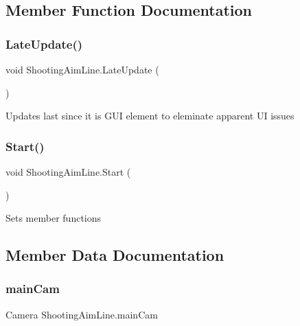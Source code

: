\subsection{Member Function Documentation}
\mbox{\label{class_shooting_aim_line_abe1fb3aafc6c03c5010c842026b1368a}} 
\subsubsection{\texorpdfstring{Late\+Update()}{LateUpdate()}}
{\footnotesize\ttfamily void Shooting\+Aim\+Line.\+Late\+Update (\begin{DoxyParamCaption}{ }\end{DoxyParamCaption})\hspace{0.3cm}{\ttfamily [private]}}

Updates last since it is G\+UI element to eleminate apparent UI issues \mbox{\label{class_shooting_aim_line_aea74f66ae5a79b70d07dbc7fe4970f34}} 
\subsubsection{\texorpdfstring{Start()}{Start()}}
{\footnotesize\ttfamily void Shooting\+Aim\+Line.\+Start (\begin{DoxyParamCaption}{ }\end{DoxyParamCaption})\hspace{0.3cm}{\ttfamily [private]}}

Sets member functions 

\subsection{Member Data Documentation}
\mbox{\label{class_shooting_aim_line_a7198b2c13fc8ce0a388f82138362cd67}} 
\subsubsection{\texorpdfstring{main\+Cam}{mainCam}}
{\footnotesize\ttfamily Camera Shooting\+Aim\+Line.\+main\+Cam\hspace{0.3cm}{\ttfamily [private]}}



